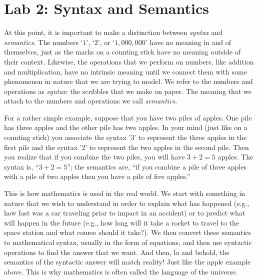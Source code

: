 \documentclass[letterpaper,12pt,fleqn]{article}
\begin{document}
\section*{Lab 2: Syntax and Semantics}

At this point, it is important to make a distinction between \emph{syntax} and
\emph{semantics}. The numbers `$1$', `$2$', or `$1,000,000$' have no meaning in and of
themselves, just as the marks on a counting stick have no meaning outside of their
context. Likewise, the operations that we perform on numbers, like addition and
multiplication, have no intrinsic meaning until we connect them with some phenomenon in
nature that we are trying to model. We refer to the numbers and operations as
\emph{syntax}: the scribbles that we make on paper. The meaning that we attach to the
numbers and operations we call \emph{semantics}.

For a rather simple example, suppose that you have two piles of apples. One pile has
three apples and the other pile has two apples. In your mind (just like on a counting
stick) you associate the syntax '$3$' to represent the three apples in the first pile and
the syntax '$2$' to represent the two apples in the second pile. Then you realize that if
you combine the two piles, you will have $3+2=5$ apples. The syntax is, ``$3+2=5$'';
the semantics are, ``if you combine a pile of three apples with a pile of two apples
then you have a pile of five apples.''

This is how mathematics is used in the real world. We start with something in nature that
we wish to understand in order to explain what has happened (e.g., how fast was a car
traveling prior to impact in an accident) or to predict what will happen in the future
(e.g., how long will it take a rocket to travel to the space station and what course
should it take?). We then convert these semantics to mathematical syntax, usually in the
form of equations, and then use syntactic operations to find the answer that we want.
And then, lo and behold, the semantics of the syntactic answer will match reality! Just
like the apple example above. This is why mathematics is often called the language of the
universe.

\bigskip
\end{document}
